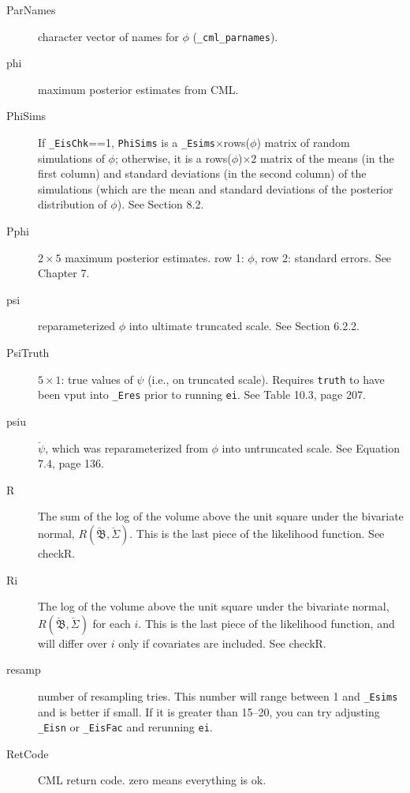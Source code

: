 \documentclass[11pt,titlepage]{article}
\newcommand{\bbetau}{\breve{\mathfrak B}}
\newcommand{\Sigmau}{\breve{\Sigma}}
\newcommand{\psiu}{\breve{\psi}}
\begin{document}
\begin{description}
\item[ParNames] character vector of names for $\phi$
  (\texttt{\_cml\_parnames}).

\item[phi] maximum posterior estimates from CML.

\item[PhiSims] If \texttt{\_EisChk}==1, \texttt{PhiSims} is a
  \texttt{\_Esims}$\times$rows($\phi$) matrix of random simulations of
  $\phi$; otherwise, it is a rows($\phi$)$\times 2$ matrix of the
  means (in the first column) and standard deviations (in the second
  column) of the simulations (which are the mean and standard
  deviations of the posterior distribution of $\phi$).  See Section
  8.2.

\item[Pphi] $2\times 5$ maximum posterior estimates.  row 1: $\phi$,
  row 2: standard errors.  See Chapter 7.

\item[psi] reparameterized $\phi$ into ultimate truncated scale.  See
  Section 6.2.2.

\item[PsiTruth] $5\times 1$: true values of $\psi$ (i.e., on truncated
  scale).  Requires \texttt{truth} to have been vput into
  \texttt{\_Eres} prior to running \texttt{ei}. See Table 10.3, page
  207.

\item[psiu] $\psiu$, which was reparameterized from $\phi$ into
  untruncated scale.  See Equation 7.4, page 136.

\item[R] The sum of the log of the volume above the unit square under
  the bivariate normal, $R(\bbetau,\Sigmau)$.  This is the last piece
  of the likelihood function.  See checkR.

\item[Ri] The log of the volume above the unit square under the
  bivariate normal, $R(\bbetau,\Sigmau)$ for each $i$.  This is the
  last piece of the likelihood function, and will differ over $i$ only
  if covariates are included.  See checkR.

\item[resamp] number of resampling tries.  This number will range
  between 1 and \texttt{\_Esims} and is better if small.  If it is
  greater than 15--20, you can try adjusting \texttt{\_Eisn} or
  \texttt{\_EisFac} and rerunning \texttt{ei}.

\item[RetCode] CML return code.  zero means everything is ok.


\end{description}
\end{document}
